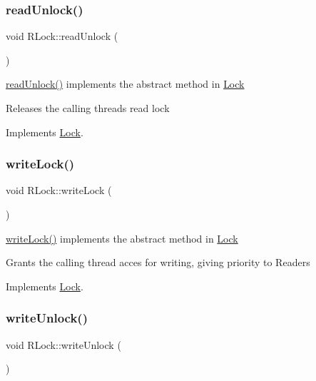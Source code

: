 \subsubsection{\texorpdfstring{read\+Unlock()}{readUnlock()}}
{\footnotesize\ttfamily void R\+Lock\+::read\+Unlock (\begin{DoxyParamCaption}{ }\end{DoxyParamCaption})\hspace{0.3cm}{\ttfamily [virtual]}}



\hyperlink{class_r_lock_a0af51edce04598b0afe551d356cfe05b}{read\+Unlock()} implements the abstract method in \hyperlink{class_lock}{Lock} 

Releases the calling thread\textquotesingle{}s read lock 

Implements \hyperlink{class_lock}{Lock}.

\mbox{\label{class_r_lock_ab04d415f49f28f6a8198f611d03e9bcd}} 
\subsubsection{\texorpdfstring{write\+Lock()}{writeLock()}}
{\footnotesize\ttfamily void R\+Lock\+::write\+Lock (\begin{DoxyParamCaption}{ }\end{DoxyParamCaption})\hspace{0.3cm}{\ttfamily [virtual]}}



\hyperlink{class_r_lock_ab04d415f49f28f6a8198f611d03e9bcd}{write\+Lock()} implements the abstract method in \hyperlink{class_lock}{Lock} 

Grants the calling thread acces for writing, giving priority to Readers 

Implements \hyperlink{class_lock}{Lock}.

\mbox{\label{class_r_lock_a4c69e6a1922b1aab3a84afeececad3fa}} 
\subsubsection{\texorpdfstring{write\+Unlock()}{writeUnlock()}}
{\footnotesize\ttfamily void R\+Lock\+::write\+Unlock (\begin{DoxyParamCaption}{ }\end{DoxyParamCaption})\hspace{0.3cm}{\ttfamily [virtual]}}



